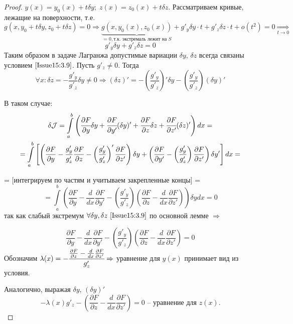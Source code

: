 \begin{proof}
$y(x)=y_0(x)+t\delta y;\;z(x)=z_0(x)+t \delta z.$ Рассматриваем кривые, лежащие на поверхности, т.е. $g(x,y_0+t\delta y,z_0+t \delta z)=0\Rightarrow \underbrace{g(x,y_0(x), z_0(x))}_{=0, \text{т.к. экстремаль лежит на } S}+g'_y\delta y \cdot t + g'_z\delta z \cdot t +o(t^2)=0 \underset{t \rightarrow 0}{\Rightarrow} $
\begin{equation}
    \label{Issue15:3.9}
    g'_y\delta y + g'_z\delta z = 0
\end{equation}
Таким образом в задаче Лагранжа допустимые вариации $\delta y$, $\delta z$ всегда связаны условием $\eqref{Issue15:3.9}$. Пусть $g'_z\neq 0$. Тогда $$\forall x: \delta z = -\frac{g'_y}{g'_z}\delta y\neq 0\Rightarrow (\delta z)'= -\left(\frac{g'_y}{g'_z}\right)'\delta y - \left(\frac{g'_y}{g'_z}\right)(\delta y)'$$

В таком случае:
\begin{multline*}
    \delta \mathcal{J}=\int\limits_a^b \left( \cfrac{\partial F}{\partial y}\delta y + \cfrac{\partial F}{\partial y'}(\delta y)' + \cfrac{\partial F}{\partial z}\delta z + \cfrac{\partial F}{\partial z'}(\delta z)' \right)d x = \\ 
    = \int\limits_a^b \left[\left(\frac{\partial F}{\partial y}-\frac{g'_y}{g'_z}\frac{\partial F}{\partial z}-\left(\frac{g'_y}{g'_z}\right)'\frac{\partial F}{\partial z'}\right)\delta y + \left(\frac{\partial F}{\partial y'}- \left(\frac{g'_y}{g'_z}\right)\frac{\partial F}{\partial z'}\right)\delta y'\right]d x = 
\end{multline*}

= [интегрируем по частям и учитываем закрепленные концы] = 
\[ 
    =\int\limits_a^b\left(\frac{\partial F}{\partial y}-\frac{d}{d x}\frac{\partial F}{\partial y'}-\left(\frac{g'_y}{g'_z}\right)\left(\frac{\partial F}{\partial z}-\frac{d}{d x}\frac{\partial F}{\partial z'}\right) \right)\delta y d x = 0 
\]
так как слабый экстремум $\forall \delta y, \delta z ~\eqref{Issue15:3.9}$ по основной лемме $\Rightarrow$

$$ \frac{\partial F}{\partial y} - \frac{d}{d x}\frac{\partial F}{\partial y'} - \left(\frac{g'_y}{g'_z}\right)\left(\frac{\partial F}{\partial z}-\frac{d}{d x}\frac{\partial F}{\partial z'}\right)=0$$
Обозначим $\lambda (x) = -\cfrac{\frac{\partial F}{\partial z}-\frac{d}{d x}\frac{\partial F}{\partial z'}}{g'_z}\Rightarrow$ уравнение для $y(x)$ принимает вид из условия.

Аналогично, выражая $\delta y$, $(\delta y)'$ 
$$-\lambda (x) g'_z-\left(\frac{\partial F}{\partial z}- \frac{d}{d x}\frac{\partial F}{\partial z'}\right)=0  \text{ -- уравнение для $z(x)$.}$$
\end{proof}